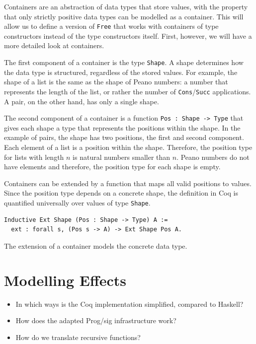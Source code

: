 \documentclass[a4paper, 11pt, fleqn, twoside]{scrreprt}
\begin{document}
Containers are an abstraction of data types that store values, with the 
property that only strictly positive data types can be modelled as a container. 
This will allow us to define a version of \texttt{Free} that works 
with containers of type constructors instead of the type constructors itself. 
First, however, we will have a more detailed look at containers.

The first component of a container is the type \texttt{Shape}. A 
shape determines how the data type is structured, regardless of the stored 
values. For example, the  shape of a list is the same as the shape of Peano 
numbers: a number that  represents the length of the list, or rather the number 
of \texttt{Cons}/\texttt{Succ} applications. A pair, 
on the other hand, has only a single shape.

The second component of a container is a function \texttt{Pos : Shape 
-> Type} that gives each shape a type that represents the positions within the 
shape. In the example of pairs, the shape has two positions, the first and 
second component. Each element of a list is a position within the shape. 
Therefore, the position type for lists with length $n$ is natural numbers 
smaller than $n$. Peano numbers do not have elements and therefore, the 
position type for each shape is empty.

Containers can be extended by a function that maps all valid positions to 
values. Since the position type depends on a concrete shape, the definition in 
Coq is quantified universally over values of type \texttt{Shape}.

\begin{verbatim}
Inductive Ext Shape (Pos : Shape -> Type) A := 
  ext : forall s, (Pos s -> A) -> Ext Shape Pos A.
\end{verbatim}

The extension of a container models the concrete data type.

\section{Modelling Effects}
\begin{itemize}
\item In which ways is the Coq implementation simplified, compared to Haskell?
\item How does the adapted Prog/sig infrastructure work?
\item How do we translate recursive functions?
\end{itemize}
\end{document}
